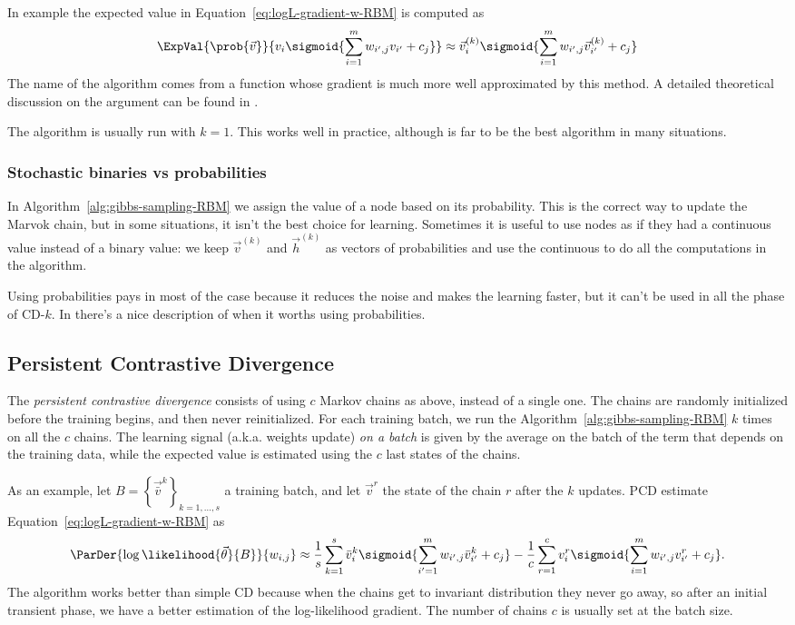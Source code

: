   In example the expected value in Equation~\eqref{eq:logL-gradient-w-RBM} is computed as
  \[
    \ExpVal{\prob{\vec{v}}}{v_i \sigmoid{\sum_{i=1}^m w_{i',j}v_{i'}+c_j}} \approx
      \vec{v}^{(k)}_i \sigmoid{\sum_{i=1}^m w_{i',j}\vec{v}^{(k)}_{i'}+c_j}
  \]
  The name of the algorithm comes from a function whose gradient is much more well approximated
  by this method. A detailed theoretical discussion on the argument can be found in
  \cite{fischer2012introduction}.
  
  The algorithm is usually run with \(k=1\). This works well in practice, although is far to be
  the best algorithm in many situations.
  
  \subsubsection*{Stochastic binaries vs probabilities}
  In Algorithm~\ref{alg:gibbs-sampling-RBM} we assign the value of a node based on its probability.
  This is the correct way to update the Marvok chain,  but in some situations, it isn't the best
  choice for learning. Sometimes it is useful to use nodes as if they had a continuous value
  instead of a binary value: we keep \(\vec{v}^{(k)}\) and \(\vec{h}^{(k)}\) as vectors of
  probabilities and use the continuous to do all the computations in the algorithm.
  
  Using probabilities pays in most of the case because it reduces the noise and makes the learning
  faster, but it can't be used in all the phase of CD-\(k\). In \cite{hinton2012practical} there's
  a nice description of when it worths using probabilities.
  
  
  \subsection{Persistent Contrastive Divergence}
  The \emph{persistent contrastive divergence} consists of using \(c\) Markov chains as above,
  instead of a single one. The chains are randomly initialized before the training begins,
  and then never reinitialized. For each training batch, we run the Algorithm~\ref{alg:gibbs-sampling-RBM}
  \(k\) times on all the \(c\) chains. The learning signal (a.k.a. weights update) \emph{on a batch}
  is given by the average on the batch of the term that depends on the training data,
  while the expected value is estimated using the \(c\) last states of the chains.
  
  As an example, let \(B = \left\{\vec{\bar{v}}^k\right\}_{k = 1, \dots, s}\) a training batch, and let
  \(\vec{v}^r\) the state of the chain \(r\) after the \(k\) updates. 
  PCD estimate  Equation~\eqref{eq:logL-gradient-w-RBM} as
  \[
    \ParDer{\log\likelihood{\vec{\theta}}{B}}{w_{i,j}} \approx
      \frac{1}{s}\sum_{k=1}^s{\bar{v}^k_i} \sigmoid{\sum_{i'=1}^m w_{i',j}{\bar{v}^k_{i'}}+c_j}
      -\frac{1}{c}\sum_{r=1}^c v^r_i \sigmoid{\sum_{i=1}^m w_{i',j}v^r_{i'}+c_j}.
  \]
  The algorithm works better than simple CD because when the chains get to invariant distribution
  they never go away, so after an initial transient phase, we have a better estimation of
  the log-likelihood gradient. The number of chains \(c\) is usually set at the batch size.
  
